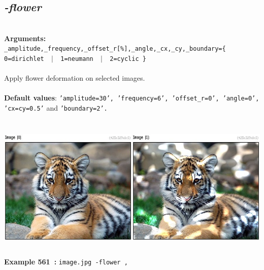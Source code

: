 \documentclass[a4paper,11pt,twoside]{book}
\begin{document}
\subsection{\emph{-flower} }\vspace*{-0.5em}
~\\\textbf{Arguments: } 
{\small \texttt{\_amplitude,\_frequency,\_offset\_r[\%],\_angle,\_cx,\_cy,\_boundary=\{ 0=dirichlet ~$|$~ 1=neumann ~$|$~ 2=cyclic \}}}\\~\\
Apply flower deformation on selected images.
~\\~\\\textbf{Default values}: {\small \texttt{'amplitude=30', 'frequency=6', 'offset\_r=0', 'angle=0', 'cx=cy=0.5'} and \texttt{'boundary=2'.}}
\begin{center}\includegraphics[keepaspectratio=true,height=7cm,width=\textwidth]{img/gmic_def561.jpg}\\
{\footnotesize \textbf{Example 561~:} \texttt{image.jpg -flower ,}}
\end{center}
\end{document}
